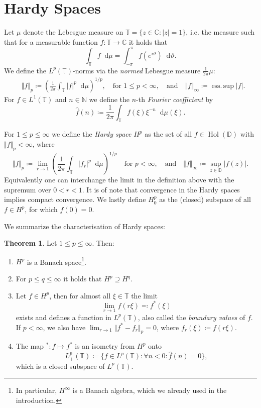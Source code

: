 \documentclass[letterpaper, 11pt]{article}
\newcommand{\C}{\mathbb{C}}
\newcommand{\D}{\mathbb{D}}
\newcommand{\T}{\mathbb{T}}
\newcommand{\N}{\mathbb{N}}
\newcommand{\1}{\mathds{1}}
\newcommand{\dd}{\mathop{}\!\mathrm{d}}
\DeclareMathOperator*{\Hol}{Hol}
\DeclareMathOperator*{\esssup}{ess.\,sup}
\theoremstyle{definition}
\newtheorem{theorem}{Theorem}
\begin{document}
\section{Hardy Spaces}

Let $\mu$ denote the Lebesgue measure on $\T = \{ z \in \C : \vert z \vert = 1 \}$, i.e. the measure such that for a measurable function $f : \T \to \C$ it holds that
$$ \int_\T f \dd \mu = \int_{-\pi}^\pi f(e^{i \vartheta}) \dd \vartheta. $$
We define the $L^p(\T)$-norms via the \emph{normed} Lebesgue measure $\frac{1}{2 \pi} \mu$:
\begin{align*}
  &\Vert f \Vert_p \coloneqq \left( \frac{1}{2\pi} \int_\T \vert f \vert^p \dd \mu \right)^{1/p}, \quad \textrm{for } 1 \leq p < \infty, \quad \textrm{and} \quad \Vert f \Vert_\infty \coloneqq \esssup \vert f \vert.
\end{align*}
For $f \in L^1(\T)$ and $n \in \N$ we define the $n$-th \emph{Fourier coefficient} by
$$ \hat{f}(n) \coloneqq \frac{1}{2\pi} \int_\T f(\xi) \xi^{-n} \dd \mu(\xi). $$

For $1 \leq p \leq \infty$ we define the \emph{Hardy space} $H^p$ as the set of all $f \in \Hol(\D)$ with $\Vert f \Vert_p < \infty$, where
$$ \Vert f \Vert_p \coloneqq \lim_{r \to 1} \left( \frac{1}{2 \pi} \int_\T \vert f_r \vert^p \dd \mu \right)^{1/p} \quad \textrm{for } p < \infty, \quad \textrm{and} \quad \Vert f \Vert_\infty \coloneqq \sup_{z \in \D} \vert f(z) \vert. $$
Equivalently one can interchange the limit in the definition above with the supremum over $0 < r < 1$.
It is of note that convergence in the Hardy spaces implies compact convergence.
We lastly define $H_0^p$ as the (closed) subspace of all $f \in H^p$, for which $f(0) = 0$.

We summarize the characterisation of Hardy spaces:
\begin{theorem} Let $1 \leq p \leq \infty$. Then:
  \begin{enumerate}
    \item $H^p$ is a Banach space\footnote{In particular, $H^\infty$ is a Banach algebra, which we already used in the introduction.}.
    \item For $p \leq q \leq \infty$ it holds that $H^p \supseteq H^q$.
    \item Let $f \in H^p$, then for almost all $\xi \in \T$ the limit
    $$ \lim_{r \to 1} f(r\xi) \eqqcolon f^*(\xi) $$
    exists and defines a function in $L^p(\T)$, also called the \emph{boundary values} of $f$. If $p < \infty$, we also have $ \lim_{r \to 1} \Vert f^* - f_r \Vert_p = 0 $, where $f_r(\xi) \coloneqq f(r \xi)$.
    \item The map ${}^* : f \mapsto f^*$ is an isometry from $H^p$ onto
    $$ L^p_+(\T) \coloneqq \{ f \in L^p(\T) : \forall n < 0: \hat{f}(n) = 0 \}, $$
    which is a closed subspace of $L^p(\T)$.
  \end{enumerate}
\end{theorem}
\end{document}
